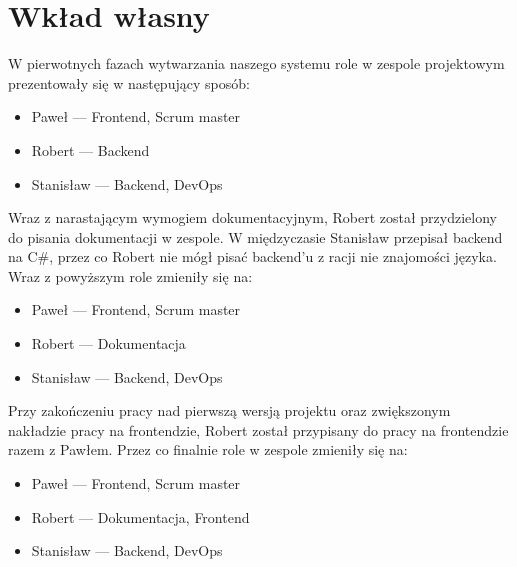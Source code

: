 \documentclass[a4paper,11pt]{report}
\begin{document}
\chapter {Wkład własny}
W pierwotnych fazach wytwarzania naszego systemu role w zespole projektowym prezentowały się w następujący sposób:
\begin{itemize}
	\item Paweł — Frontend, Scrum master
	\item Robert — Backend
	\item Stanisław — Backend, DevOps
\end{itemize}
Wraz z narastającym wymogiem dokumentacyjnym, Robert został przydzielony do pisania dokumentacji w zespole.
W międzyczasie Stanisław przepisał backend na C\#, przez co Robert nie mógł pisać backend'u z racji nie znajomości języka.
Wraz z powyższym role zmieniły się na:
\begin{itemize}
	\item Paweł — Frontend, Scrum master
	\item Robert — Dokumentacja
	\item Stanisław — Backend, DevOps
\end{itemize}
Przy zakończeniu pracy nad pierwszą wersją projektu oraz zwiększonym nakładzie pracy na frontendzie, Robert został przypisany do pracy na frontendzie razem z Pawłem.
Przez co finalnie role w zespole zmieniły się na:
\begin{itemize}
	\item Paweł — Frontend, Scrum master
	\item Robert — Dokumentacja, Frontend
	\item Stanisław — Backend, DevOps
\end{itemize}
\end{document}
